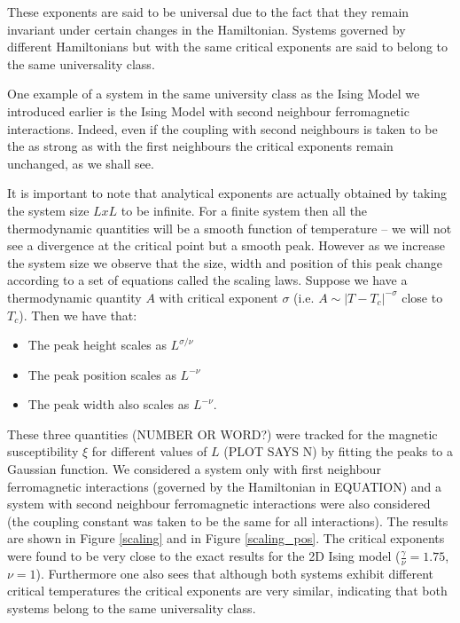 \documentclass[twoside]{article}
\begin{document}
\begin{multicols}{2}

These exponents are said to be universal due to the fact that they remain invariant under certain changes in the Hamiltonian. Systems governed by different Hamiltonians but with the same critical exponents are said to belong to the same universality class. 

One example of a system in the same university class as the Ising Model we introduced earlier is the Ising Model with second neighbour ferromagnetic interactions. Indeed, even if the coupling with second neighbours is taken to be the as strong as with the first neighbours the critical exponents remain unchanged, as we shall see.

It is important to note that analytical exponents are actually obtained by taking the system size $LxL$ to be infinite. For a finite system then all the thermodynamic quantities will be a smooth function of temperature -- we will not see a divergence at the critical point but a smooth peak. However as we increase the system size we observe that the size, width and position of this peak change according to a set of equations called the scaling laws. Suppose we have a thermodynamic quantity $A$ with critical exponent $\sigma$ (i.e. $A \sim |T-T_c|^{-\sigma}$ close to $T_c$). Then we have that:

\begin{itemize}
\item The peak height scales as $L^{\sigma/\nu}$
\item The peak position scales as $L^{-\nu}$
\item The peak width also scales as $L^{-\nu}$.
\end{itemize}

These three quantities (NUMBER OR WORD?) were tracked for the magnetic susceptibility $\xi$ for different values of $L$ (PLOT SAYS N) by fitting the peaks to a Gaussian function. We considered a system only with first neighbour ferromagnetic interactions (governed by the Hamiltonian in EQUATION) and a system with second neighbour ferromagnetic interactions were also considered (the coupling constant was taken to be the same for all interactions). The results are shown in Figure \ref{scaling} and in Figure \ref{scaling_pos}. The critical exponents were found to be very close to the exact results for the 2D Ising model ($\frac{\gamma}{\nu} = 1.75$, $\nu = 1$). Furthermore one also sees that although both systems exhibit different critical temperatures the critical exponents are very similar, indicating that both systems belong to the same universality class.


\end{multicols}
\end{document}
